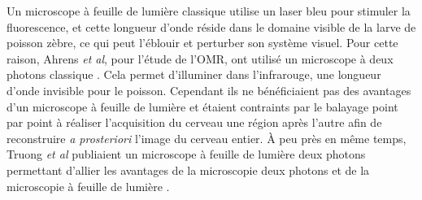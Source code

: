

Un microscope à feuille de lumière classique utilise un laser bleu pour stimuler la fluorescence, et cette longueur d'onde réside dans le domaine visible de la larve de poisson zèbre, ce qui peut l'éblouir et perturber son système visuel. Pour cette raison, Ahrens \emph{et al}, pour l'étude de l'OMR, ont utilisé un microscope à deux photons classique \cite{ahrens_brain-wide_2012}. Cela permet d'illuminer dans l'infrarouge, une longueur d'onde invisible pour le poisson. Cependant ils ne bénéficiaient pas des avantages d'un microscope à feuille de lumière et étaient contraints par le balayage point par point à réaliser l'acquisition du cerveau une région après l'autre afin de reconstruire \emph{a prosteriori} l'image du cerveau entier. À peu près en même temps, Truong \emph{et al} publiaient un microscope à feuille de lumière deux photons permettant d'allier les avantages de la microscopie deux photons et de la microscopie à feuille de lumière \cite{truong_deep_2011}.




